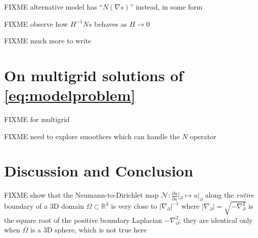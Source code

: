 \documentclass[letterpaper,final,12pt,reqno]{amsart}
\theoremstyle{cstyle}
\theoremstyle{cstyle*}
\theoremstyle{dstyle}
\numberwithin{equation}{section}
\numberwithin{figure}{section}
\numberwithin{table}{section}
\numberwithin{theorem}{section}
\newcommand{\RR}{\mathbb{R}}
\newcommand{\grad}{\nabla}
\begin{document}
FIXME alternative model has ``$N(\grad s)$'' instead, in some form

FIXME observe how $H^{-1} Ns$ behaves as $H\to 0$

FIXME much more to write

\section{On multigrid solutions of \eqref{eq:modelproblem}} \label{sec:numerical}

FIXME \cite{Briggsetal2000,Bueler2021,Trottenbergetal2001} for multigrid

FIXME need to explore smoothers which can handle the $N$ operator

\section{Discussion and Conclusion} \label{sec:conclusion}

FIXME \cite{Girouardetal2022} show that the Neumann-to-Dirichlet map $\mathcal{N}:\frac{\partial u}{\partial n}|_{\partial} \mapsto u|_{\partial}$ along the \emph{entire} boundary of a 3D domain $\Omega \subset \RR^3$ is very close to $|\grad_{\partial}|^{-1}$ where $|\grad_{\partial}| = \sqrt{-\grad_{\partial}^2}$ is the square root of the positive boundary Laplacian $-\grad_{\partial}^2$; they are identical only when $\Omega$ is a 3D sphere, which is not true here





\end{document}
